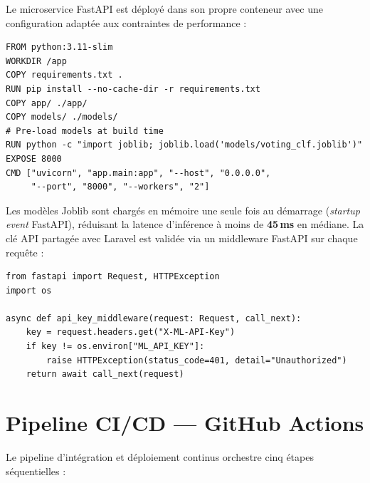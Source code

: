 Le microservice FastAPI est déployé dans son propre conteneur avec une configuration
adaptée aux contraintes de performance :

\begin{lstlisting}[style=yamlstyle,caption={Dockerfile — Microservice ML FastAPI},
  label={lst:dockerfile_ml}]
FROM python:3.11-slim
WORKDIR /app
COPY requirements.txt .
RUN pip install --no-cache-dir -r requirements.txt
COPY app/ ./app/
COPY models/ ./models/
# Pre-load models at build time
RUN python -c "import joblib; joblib.load('models/voting_clf.joblib')"
EXPOSE 8000
CMD ["uvicorn", "app.main:app", "--host", "0.0.0.0",
     "--port", "8000", "--workers", "2"]
\end{lstlisting}

Les modèles Joblib sont chargés en mémoire une seule fois au démarrage
(\textit{startup event} FastAPI), réduisant la latence d'inférence à
moins de \textbf{45\,ms} en médiane. La clé API partagée avec Laravel est
validée via un middleware FastAPI sur chaque requête :

\begin{lstlisting}[style=pythonstyle,caption={Middleware d'authentification FastAPI},
  label={lst:ml_auth_middleware}]
from fastapi import Request, HTTPException
import os

async def api_key_middleware(request: Request, call_next):
    key = request.headers.get("X-ML-API-Key")
    if key != os.environ["ML_API_KEY"]:
        raise HTTPException(status_code=401, detail="Unauthorized")
    return await call_next(request)
\end{lstlisting}

\section{Pipeline CI/CD — GitHub Actions}

Le pipeline d'intégration et déploiement continus orchestre cinq étapes séquentielles :

